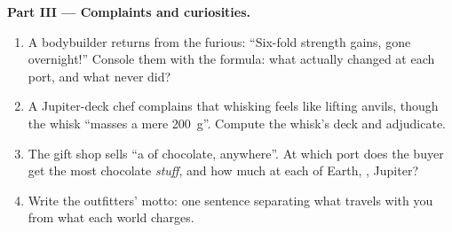\begin{problem}
\medskip\noindent\textbf{Part III --- Complaints and
curiosities.}
\begin{enumerate}[resume]
  \item A bodybuilder returns from the  furious:
        ``Six-fold strength gains, gone overnight!''
        Console them with the formula: what actually
        changed at each port, and what never did?
  \item A Jupiter-deck chef complains that whisking feels
        like lifting anvils, though the whisk ``masses a
        mere \qty{200}{g}''. Compute the whisk's deck
         and adjudicate.
  \item The gift shop sells ``a  of chocolate,
        anywhere''. At which port does the buyer get the
        most chocolate \emph{stuff}, and how much  at
        each of Earth, , Jupiter?
  \item Write the outfitters' motto: one sentence
        separating what travels with you from what each
        world charges.
\end{enumerate}
\end{problem}
